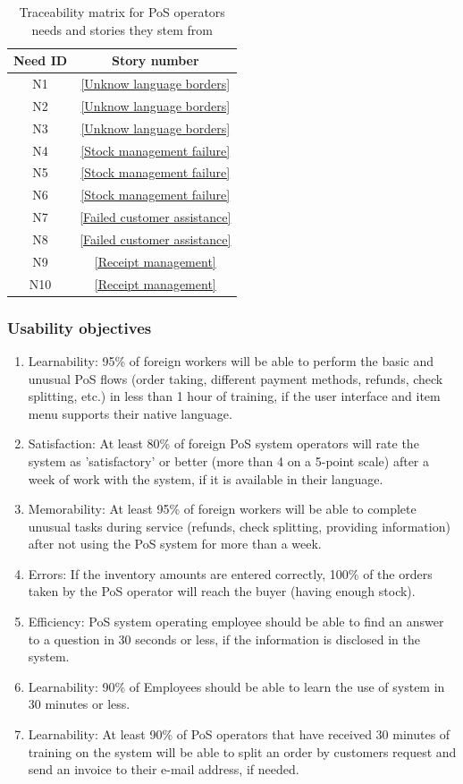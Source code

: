 \documentclass{article}
\begin{document}
\begin{table}[h]
\centering
\caption{Traceability matrix for PoS operators needs and stories they stem from}
\begin{tabular}{|c|c|}
\hline
\textbf{Need ID} & \textbf{Story number} \\ \hline
N1  & \ref{Unknow language borders} \\ \hline
N2  & \ref{Unknow language borders} \\ \hline
N3  & \ref{Unknow language borders} \\ \hline
N4  & \ref{Stock management failure} \\ \hline
N5  & \ref{Stock management failure} \\ \hline
N6  & \ref{Stock management failure} \\ \hline
N7  & \ref{Failed customer assistance} \\ \hline
N8  & \ref{Failed customer assistance} \\ \hline
N9  & \ref{Receipt management} \\ \hline
N10 & \ref{Receipt management} \\ \hline
\end{tabular}
\end{table}

\subsubsection{Usability objectives}
\begin{enumerate}[label=S\arabic*.]
    \item Learnability: 95\% of foreign workers will be able to perform the basic and unusual PoS flows (order taking, different payment methods, refunds, check splitting, etc.) in less than 1 hour of training, if the user interface and item menu supports their native language.
    \item Satisfaction: At least 80\% of foreign PoS system operators will rate the system as 'satisfactory' or better (more than 4 on a 5-point scale) after a week of work with the system, if it is available in their language.
    \item Memorability: At least 95\% of foreign workers will be able to complete unusual tasks during service (refunds, check splitting, providing information) after not using the PoS system for more than a week.
    \item Errors: If the inventory amounts are entered correctly, 100\% of the orders taken by the PoS operator will reach the buyer (having enough stock).
    \item Efficiency: PoS system operating employee should be able to find an answer to a question in 30 seconds or less, if the information is disclosed in the system.
    \item Learnability: 90\% of Employees should be able to learn the use of system in 30 minutes or less.
    \item Learnability: At least  90\% of PoS operators that have received 30 minutes of training on the system will be able to split an order by customers request and send an invoice to their e-mail address, if needed.
\end{enumerate}
\end{document}
